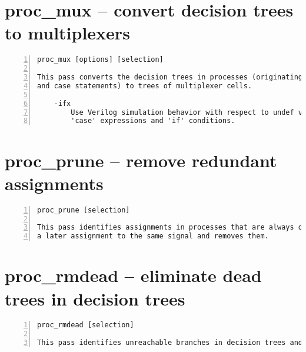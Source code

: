 \section{proc\_mux -- convert decision trees to multiplexers}
\label{cmd:proc_mux}
\begin{lstlisting}[numbers=left,frame=single]
    proc_mux [options] [selection]

This pass converts the decision trees in processes (originating from if-else
and case statements) to trees of multiplexer cells.

    -ifx
        Use Verilog simulation behavior with respect to undef values in
        'case' expressions and 'if' conditions.
\end{lstlisting}

\section{proc\_prune -- remove redundant assignments}
\label{cmd:proc_prune}
\begin{lstlisting}[numbers=left,frame=single]
    proc_prune [selection]

This pass identifies assignments in processes that are always overwritten by
a later assignment to the same signal and removes them.
\end{lstlisting}

\section{proc\_rmdead -- eliminate dead trees in decision trees}
\label{cmd:proc_rmdead}
\begin{lstlisting}[numbers=left,frame=single]
    proc_rmdead [selection]

This pass identifies unreachable branches in decision trees and removes them.
\end{lstlisting}

